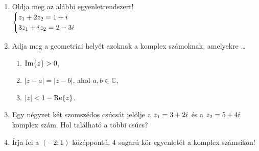 \documentclass[a4paper, 12pt]{scrartcl}
\begin{document}
\begin{enumerate}
  \item Oldja meg az alábbi egyenletrendszert!\\[2mm]
        \hspace{2ex}$
          \begin{cases}
            z_1 + 2z_2 = 1 + {i\mkern1mu}    \\
            3z_1 + {i\mkern1mu} z_2 = 2 - 3i \\
          \end{cases}
        $

  \item Adja meg a geometriai helyét azoknak a komplex számoknak, amelyekre
        \dots
        \begin{enumerate}
          \item $\operatorname{Im} \{ z \} > 0$,
          \item $|z - a| = |z - b|$, ahol $a, b \in \mathbb C$,
          \item $|z| < 1 - \operatorname{Re} \{ z \}$.
        \end{enumerate}

  \item Egy négyzet két szomszédos csúcsát jelölje a $z_1 = 3 + 2 {i\mkern1mu}$ és a
        $z_2 = 5 + 4 {i\mkern1mu}$ komplex szám. Hol található a többi csúcs?

  \item Írja fel a $(-2; 1)$ középpontú, $4$ sugarú kör egyenletét a komplex
        számsíkon!
\end{enumerate}

\end{document}
